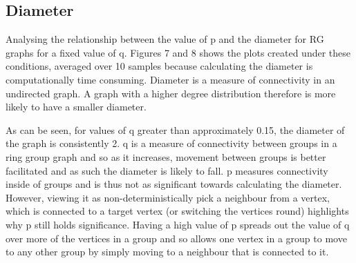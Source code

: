 \documentclass[12pt,a4paper]{article}
\begin{document}
\newpage
\subsection{Diameter}
Analysing the relationship between the value of p and the diameter for RG graphs for a fixed value of q. Figures 7 and 8 shows the plots created under these conditions, averaged over 10 samples because calculating the diameter is computationally time consuming. Diameter is a measure of connectivity in an undirected graph. A graph with a higher degree distribution therefore is more likely to have a smaller diameter. 

As can be seen, for values of q greater than approximately 0.15, the diameter of the graph is consistently 2. q is a measure of connectivity between groups in a ring group graph and so as it increases, movement between groups is better facilitated and as such the diameter is likely to fall. p measures connectivity inside of groups and is thus not as significant towards calculating the diameter. However, viewing it as non-deterministically pick a neighbour from a vertex, which is connected to a target vertex (or switching the vertices round) highlights why p still holds significance. Having a high value of p spreads out the value of q over more of the vertices in a group and so allows one vertex in a group to move to any other group by simply moving to a neighbour that is connected to it.
\end{document}
